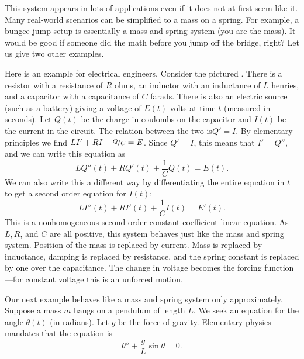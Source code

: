 \documentclass{ximera}
\begin{document}
This system appears in lots of applications even if it does not at first seem like it.  Many real-world scenarios can be simplified to a mass on a spring.  For example, a bungee jump setup is essentially a mass and spring system (you are the mass).  It would be good if someone did the math before you jump off the bridge, right?  Let us give two other examples.


\begin{mywrapfigsimp}[5]{1.35in}{1.65in}
    \noindent
    
\end{mywrapfigsimp}
Here is an example for electrical engineers. Consider the pictured . There is a resistor with a resistance of $R$ ohms, an inductor with an inductance of $L$ henries, and a capacitor with a capacitance of $C$ farads.  There is also an electric source (such as a battery) giving a voltage of $E(t)$ volts at time $t$ (measured in seconds). Let $Q(t)$ be the charge in coulombs on the capacitor and $I(t)$ be the current in the circuit.  The relation between the two is$Q' = I$.  By elementary principles we find $L I' + RI + \nicefrac{Q}{C} = E$. Since $Q' = I$, this means that $I' = Q''$, and we can write this equation as
\begin{equation*}
    LQ''(t) + RQ'(t) + \frac{1}{C}Q(t) = E(t).
\end{equation*}   
We can also write this a different way by differentiating the entire equation in $t$ to get a second order equation for $I(t)$: 
\begin{equation*}
    L I''(t) + R I'(t) + \frac{1}{C} I(t) = E'(t) .
\end{equation*}
This is a nonhomogeneous second order constant coefficient linear equation. As $L, R$, and $C$ are all positive, this system behaves just like the mass and spring system.  Position of the mass is replaced by current. Mass is replaced by inductance, damping is replaced by resistance, and the spring constant is replaced by one over the capacitance.  The change in voltage becomes the forcing function---for constant voltage this is an unforced motion.


\begin{mywrapfigsimp}[10]{1.8in}{2.16in}
    \noindent
    
\end{mywrapfigsimp}
Our next example behaves like a mass and spring system only approximately. Suppose a mass $m$ hangs on a pendulum of length $L$.  We seek an equation for the angle $\theta(t)$ (in radians).  Let $g$ be the force of gravity. Elementary physics mandates that the equation is
\begin{equation*}
    \theta'' + \frac{g}{L} \sin \theta = 0 .
\end{equation*}
\end{document}
